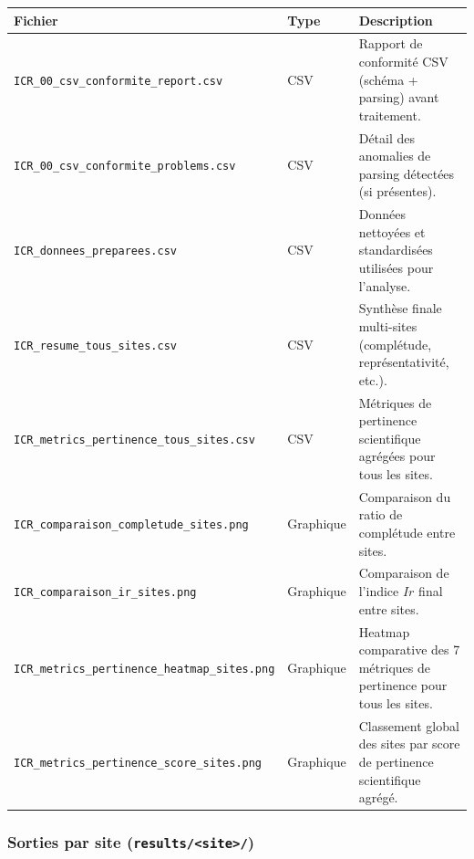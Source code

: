 {\def\LTcaptype{none} %
\begin{longtable}[]{@{}
  >{\raggedright\arraybackslash}p{}
  >{\raggedright\arraybackslash}p{}
  >{\raggedright\arraybackslash}p{}@{}}
\toprule\noalign{}
\begin{minipage}[b]{\linewidth}\raggedright
Fichier
\end{minipage} & \begin{minipage}[b]{\linewidth}\raggedright
Type
\end{minipage} & \begin{minipage}[b]{\linewidth}\raggedright
Description
\end{minipage} \\
\midrule\noalign{}
\endhead
\bottomrule\noalign{}
\endlastfoot
\texttt{ICR\_00\_csv\_conformite\_report.csv} & CSV & Rapport de
conformité CSV (schéma + parsing) avant traitement. \\
\texttt{ICR\_00\_csv\_conformite\_problems.csv} & CSV & Détail des
anomalies de parsing détectées (si présentes). \\
\texttt{ICR\_donnees\_preparees.csv} & CSV & Données nettoyées et
standardisées utilisées pour l'analyse. \\
\texttt{ICR\_resume\_tous\_sites.csv} & CSV & Synthèse finale
multi-sites (complétude, représentativité, etc.). \\
\texttt{ICR\_metrics\_pertinence\_tous\_sites.csv} & CSV & Métriques de
pertinence scientifique agrégées pour tous les sites. \\
\texttt{ICR\_comparaison\_completude\_sites.png} & Graphique &
Comparaison du ratio de complétude entre sites. \\
\texttt{ICR\_comparaison\_ir\_sites.png} & Graphique & Comparaison de
l'indice \(Ir\) final entre sites. \\
\texttt{ICR\_metrics\_pertinence\_heatmap\_sites.png} & Graphique &
Heatmap comparative des 7 métriques de pertinence pour tous les
sites. \\
\texttt{ICR\_metrics\_pertinence\_score\_sites.png} & Graphique &
Classement global des sites par score de pertinence scientifique
agrégé. \\
\end{longtable}
}

\subsubsection{\texorpdfstring{Sorties par site
(\texttt{results/\textless{}site\textgreater{}/})}{Sorties par site (results/\textless site\textgreater/)}}\label{sorties-par-site-resultssite}

